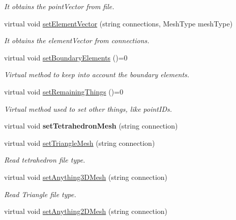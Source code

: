 \begin{DoxyCompactItemize}
\begin{DoxyCompactList}\small\item\em It obtains the point\+Vector from file. \end{DoxyCompactList}\item 
virtual void \hyperlink{class_mesh_af6e1d08bb6a3d3a69a5ca363f8545442}{set\+Element\+Vector} (string connections, Mesh\+Type mesh\+Type)
\begin{DoxyCompactList}\small\item\em It obtains the element\+Vector from connections. \end{DoxyCompactList}\item 
virtual void \hyperlink{class_mesh_a887eb0d187f2da37b4c785d68dfcf7ad}{set\+Boundary\+Elements} ()=0
\begin{DoxyCompactList}\small\item\em Virtual method to keep into account the boundary elements. \end{DoxyCompactList}\item 
virtual void \hyperlink{class_mesh_a70d7cba1e66435915fb1db7c430aa44f}{set\+Remaining\+Things} ()=0
\begin{DoxyCompactList}\small\item\em Virtual method used to set other things, like point\+I\+Ds. \end{DoxyCompactList}\item 
virtual void {\bfseries set\+Tetrahedron\+Mesh} (string connection)\hypertarget{class_mesh_a55b0d4231dea5fce30cfe45a0a0c65f0}{}\label{class_mesh_a55b0d4231dea5fce30cfe45a0a0c65f0}

\item 
virtual void \hyperlink{class_mesh_aa06732e9d97c6753e880edda677b21b5}{set\+Triangle\+Mesh} (string connection)\hypertarget{class_mesh_aa06732e9d97c6753e880edda677b21b5}{}\label{class_mesh_aa06732e9d97c6753e880edda677b21b5}

\begin{DoxyCompactList}\small\item\em Read tetrahedron file type. \end{DoxyCompactList}\item 
virtual void \hyperlink{class_mesh_ae066f4f10aaaaa6d49f581dde9721c8a}{set\+Anything3\+D\+Mesh} (string connection)\hypertarget{class_mesh_ae066f4f10aaaaa6d49f581dde9721c8a}{}\label{class_mesh_ae066f4f10aaaaa6d49f581dde9721c8a}

\begin{DoxyCompactList}\small\item\em Read Triangle file type. \end{DoxyCompactList}\item 
virtual void \hyperlink{class_mesh_a2ecf67041cd4170bbe58e150c0463f22}{set\+Anything2\+D\+Mesh} (string connection)\hypertarget{class_mesh_a2ecf67041cd4170bbe58e150c0463f22}{}\label{class_mesh_a2ecf67041cd4170bbe58e150c0463f22}


\end{DoxyCompactItemize}
